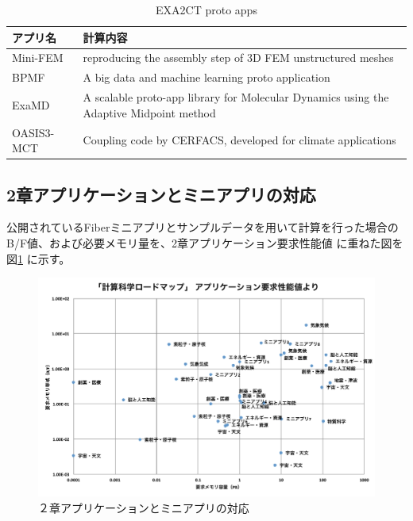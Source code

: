 \begin{table}[H]
\caption{EXA2CT proto apps}
\label{tab:exa2ct-proto-apps}
{
\begin{tabular}{p{50mm}|p{100mm}} \hline
アプリ名		&	計算内容 \\ \hline
\hline
Mini-FEM & reproducing the assembly step of 3D FEM unstructured meshes \\ \hline
BPMF	& A big data and machine learning proto application \\ \hline
ExaMD	& A scalable proto-app library for Molecular Dynamics using
			the Adaptive Midpoint method  \\ \hline
OASIS3-MCT & Coupling code by CERFACS, developed for climate applications
\\ \hline
\end{tabular}
}
\end{table}

\subsection{2章アプリケーションとミニアプリの対応}
\label{sec:apps-and-miniapps}

公開されているFiberミニアプリとサンプルデータを用いて計算を行った場合のB/F値、および必要メモリ量を、2章アプリケーション要求性能値
に重ねた図を図\ref{fig:apps-miniapps} に示す。

\begin{figure}[h]
\includegraphics[width=\textwidth]{figs/3-2-miniapps.pdf}
\caption{２章アプリケーションとミニアプリの対応}
\label{fig:apps-miniapps}
\end{figure}


\nocite{*}



